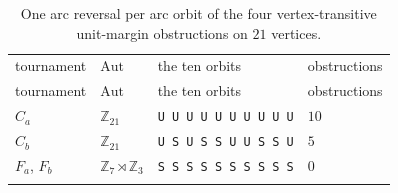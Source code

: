 \documentclass[
]{article}
\begin{document}
\begin{longtable}[]{@{}
  >{\raggedright\arraybackslash}p{}
  >{\raggedright\arraybackslash}p{}
  >{\raggedright\arraybackslash}p{}
  >{\raggedright\arraybackslash}p{}@{}}
\caption{One arc reversal per arc orbit of the four vertex-transitive
unit-margin obstructions on \(21\) vertices.}\tabularnewline*
\toprule\noalign{}
\begin{minipage}[b]{\linewidth}\raggedright
tournament
\end{minipage} & \begin{minipage}[b]{\linewidth}\raggedright
\(\mathrm{Aut}\)
\end{minipage} & \begin{minipage}[b]{\linewidth}\raggedright
the ten orbits
\end{minipage} & \begin{minipage}[b]{\linewidth}\raggedright
obstructions
\end{minipage} \\*
\midrule\noalign{}
\endfirsthead
\toprule\noalign{}
\begin{minipage}[b]{\linewidth}\raggedright
tournament
\end{minipage} & \begin{minipage}[b]{\linewidth}\raggedright
\(\mathrm{Aut}\)
\end{minipage} & \begin{minipage}[b]{\linewidth}\raggedright
the ten orbits
\end{minipage} & \begin{minipage}[b]{\linewidth}\raggedright
obstructions
\end{minipage} \\*
\midrule\noalign{}
\endhead
\bottomrule\noalign{}
\endlastfoot
\(C_a\) & \(\mathbb{Z}_{21}\) & \texttt{U\ U\ U\ U\ U\ U\ U\ U\ U\ U} &
\(10\) \\*
\(C_b\) & \(\mathbb{Z}_{21}\) & \texttt{U\ S\ U\ S\ S\ U\ U\ S\ S\ U} &
\(5\) \\*
\(F_a\), \(F_b\) & \(\mathbb{Z}_7 \rtimes \mathbb{Z}_3\) &
\texttt{S\ S\ S\ S\ S\ S\ S\ S\ S\ S} & \(0\) \\*
\end{longtable}

\end{document}
